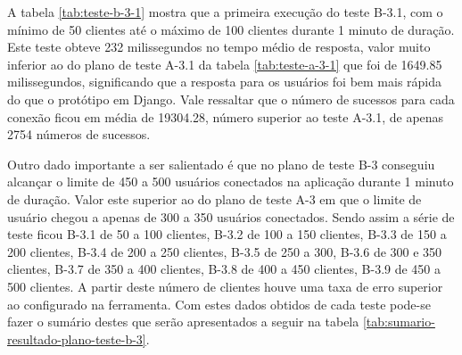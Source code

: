   A tabela \ref{tab:teste-b-3-1} mostra que a primeira execução do teste B-3.1, com o mínimo de 50 clientes até o máximo de 100 clientes
  durante 1 minuto de duração. Este teste obteve 232 milissegundos no tempo médio de resposta, valor muito inferior ao do plano de
  teste A-3.1 da tabela \ref{tab:teste-a-3-1} que foi de 1649.85 milissegundos, significando que a resposta para os usuários
  foi bem mais rápida do que o protótipo em Django. Vale ressaltar que o número de sucessos para cada conexão ficou em média de 
  19304.28, número superior ao teste A-3.1, de apenas 2754 números de sucessos.
  
  Outro dado importante a ser salientado é que no plano de teste B-3 conseguiu alcançar o limite de 450 a 500 usuários conectados
  na aplicação durante 1 minuto de duração. Valor este superior ao do plano de teste A-3 em que o limite de usuário chegou a apenas
  de 300 a 350 usuários conectados. Sendo assim a série de teste ficou B-3.1 de 50 a 100 clientes, B-3.2 de 100 a 150 clientes, 
  B-3.3 de 150 a 200 clientes, B-3.4 de 200 a 250 clientes, B-3.5 de 250 a 300, B-3.6 de 300 e 350 clientes, B-3.7 de 350 a 400 clientes,
  B-3.8 de 400 a 450 clientes, B-3.9 de 450 a 500 clientes. A partir deste número de clientes houve uma taxa de erro superior ao
  configurado na ferramenta. Com estes dados obtidos de cada teste pode-se fazer o sumário
  destes que serão apresentados a seguir na tabela \ref{tab:sumario-resultado-plano-teste-b-3}.
  
